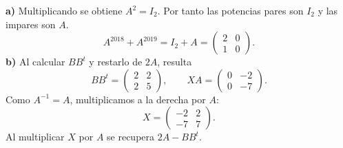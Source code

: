 \textbf{a)} Multiplicando se obtiene $A^2=I_2$.
Por tanto las potencias pares son $I_2$ y las impares son $A$.
\[
A^{2018}+A^{2019}=I_2+A=\boxed{\begin{pmatrix}2&0\\1&0\end{pmatrix}}.
\]
\textbf{b)} Al calcular $BB^t$ y restarlo de $2A$, resulta
\[
BB^t=\begin{pmatrix}2&2\\2&5\end{pmatrix},\qquad
XA=\begin{pmatrix}0&-2\\0&-7\end{pmatrix}.
\]
Como $A^{-1}=A$, multiplicamos a la derecha por $A$:
\[
X=\boxed{\begin{pmatrix}-2&2\\-7&7\end{pmatrix}}.
\]
Al multiplicar $X$ por $A$ se recupera $2A-BB^t$.
